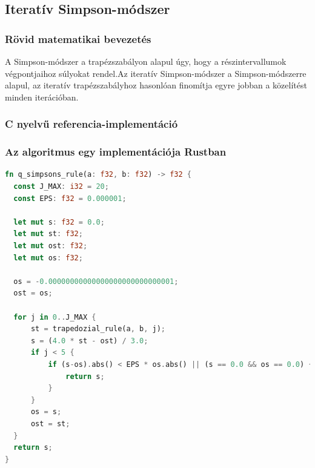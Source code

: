 \subsection{Iteratív Simpson-módszer}
\subsubsection{Rövid matematikai bevezetés}
A Simpson-módszer a trapézszabályon alapul úgy, hogy a részintervallumok végpontjaihoz súlyokat rendel.Az iteratív Simpson-módszer a Simpson-módszerre alapul, az iteratív trapézszabályhoz hasonlóan finomítja egyre jobban a közelítést minden iterációban.
\subsubsection{C nyelvű referencia-implementáció}
\subsubsection{Az algoritmus egy implementációja Rustban}
\begin{lstlisting}[language=Rust]
fn q_simpsons_rule(a: f32, b: f32) -> f32 {
  const J_MAX: i32 = 20;
  const EPS: f32 = 0.000001;
	  
  let mut s: f32 = 0.0;
  let mut st: f32;
  let mut ost: f32;
  let mut os: f32;
  
  os = -0.00000000000000000000000000001;
  ost = os;
  
  for j in 0..J_MAX {
	  st = trapedozial_rule(a, b, j);
	  s = (4.0 * st - ost) / 3.0;
	  if j < 5 {
		  if (s-os).abs() < EPS * os.abs() || (s == 0.0 && os == 0.0) {
			  return s;
		  }
	  }
	  os = s;
	  ost = st;
  }
  return s;
}
\end{lstlisting}
